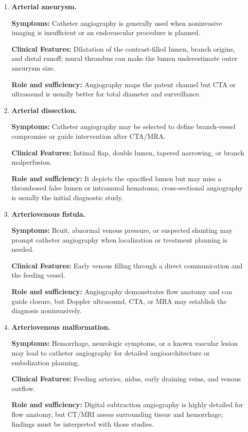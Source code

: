 \begin{enumerate}[leftmargin=*,itemsep=0.45em,topsep=0.4em]
\item \textbf{Arterial aneurysm.}\par\noindent\textbf{Symptoms:} Catheter angiography is generally used when noninvasive imaging is insufficient or an endovascular procedure is planned.\par\noindent\textbf{Clinical Features:} Dilatation of the contrast-filled lumen, branch origins, and distal runoff; mural thrombus can make the lumen underestimate outer aneurysm size.\par\noindent\textbf{Role and sufficiency:} Angiography maps the patent channel but CTA or ultrasound is usually better for total diameter and surveillance.
\item \textbf{Arterial dissection.}\par\noindent\textbf{Symptoms:} Catheter angiography may be selected to define branch-vessel compromise or guide intervention after CTA/MRA.\par\noindent\textbf{Clinical Features:} Intimal flap, double lumen, tapered narrowing, or branch malperfusion.\par\noindent\textbf{Role and sufficiency:} It depicts the opacified lumen but may miss a thrombosed false lumen or intramural hematoma; cross-sectional angiography is usually the initial diagnostic study.
\item \textbf{Arteriovenous fistula.}\par\noindent\textbf{Symptoms:} Bruit, abnormal venous pressure, or suspected shunting may prompt catheter angiography when localization or treatment planning is needed.\par\noindent\textbf{Clinical Features:} Early venous filling through a direct communication and the feeding vessel.\par\noindent\textbf{Role and sufficiency:} Angiography demonstrates flow anatomy and can guide closure, but Doppler ultrasound, CTA, or MRA may establish the diagnosis noninvasively.
\item \textbf{Arteriovenous malformation.}\par\noindent\textbf{Symptoms:} Hemorrhage, neurologic symptoms, or a known vascular lesion may lead to catheter angiography for detailed angioarchitecture or embolization planning.\par\noindent\textbf{Clinical Features:} Feeding arteries, nidus, early draining veins, and venous outflow.\par\noindent\textbf{Role and sufficiency:} Digital subtraction angiography is highly detailed for flow anatomy, but CT/MRI assess surrounding tissue and hemorrhage; findings must be interpreted with those studies.

\end{enumerate}
